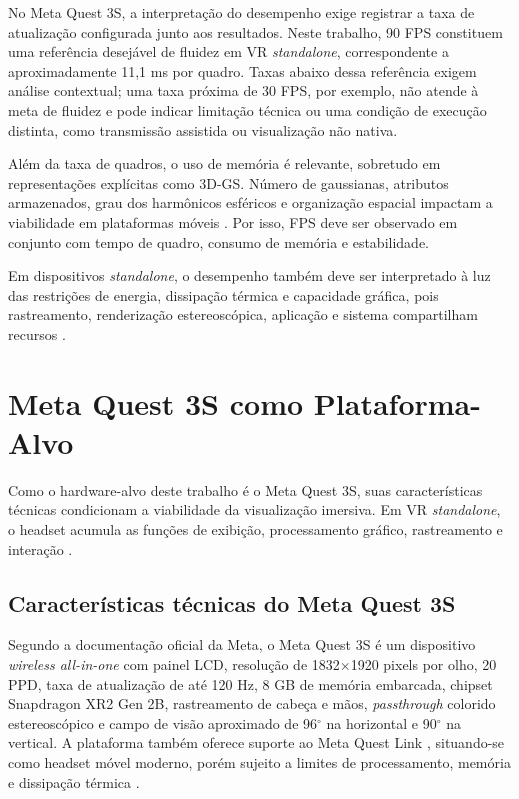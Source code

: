 No Meta Quest 3S, a interpretação do desempenho exige registrar a taxa de atualização configurada junto aos resultados. Neste trabalho, 90 FPS constituem uma referência desejável de fluidez em VR \textit{standalone}, correspondente a aproximadamente 11,1 ms por quadro. Taxas abaixo dessa referência exigem análise contextual; uma taxa próxima de 30 FPS, por exemplo, não atende à meta de fluidez e pode indicar limitação técnica ou uma condição de execução distinta, como transmissão assistida ou visualização não nativa.

Além da taxa de quadros, o uso de memória é relevante, sobretudo em representações explícitas como 3D-GS. Número de gaussianas, atributos armazenados, grau dos harmônicos esféricos e organização espacial impactam a viabilidade em plataformas móveis \cite{kerbl2023,fei2025survey3dgs,wu2025,fang2024,huang2025,fan2024lightgaussian}. Por isso, FPS deve ser observado em conjunto com tempo de quadro, consumo de memória e estabilidade.

Em dispositivos \textit{standalone}, o desempenho também deve ser interpretado à luz das restrições de energia, dissipação térmica e capacidade gráfica, pois rastreamento, renderização estereoscópica, aplicação e sistema compartilham recursos \cite{metaquest3s2024,qualcommxr2gen2,xu2023}.

\section{Meta Quest 3S como Plataforma-Alvo}
\label{sec:meta_quest_3s}

Como o hardware-alvo deste trabalho é o Meta Quest 3S, suas características técnicas condicionam a viabilidade da visualização imersiva. Em VR \textit{standalone}, o headset acumula as funções de exibição, processamento gráfico, rastreamento e interação \cite{metaquest3s2024,qualcommxr2gen2,xu2023,tu2025}.

\subsection{Características técnicas do Meta Quest 3S}

Segundo a documentação oficial da Meta, o Meta Quest 3S é um dispositivo \textit{wireless all-in-one} com painel LCD, resolução de 1832$\times$1920 pixels por olho, 20 PPD, taxa de atualização de até 120 Hz, 8 GB de memória embarcada, chipset Snapdragon XR2 Gen 2B, rastreamento de cabeça e mãos, \textit{passthrough} colorido estereoscópico e campo de visão aproximado de 96$^\circ$ na horizontal e 90$^\circ$ na vertical. A plataforma também oferece suporte ao Meta Quest Link \cite{metaquest3s2024}, situando-se como headset móvel moderno, porém sujeito a limites de processamento, memória e dissipação térmica \cite{qualcommxr2gen2,metaquest3s2024}.

